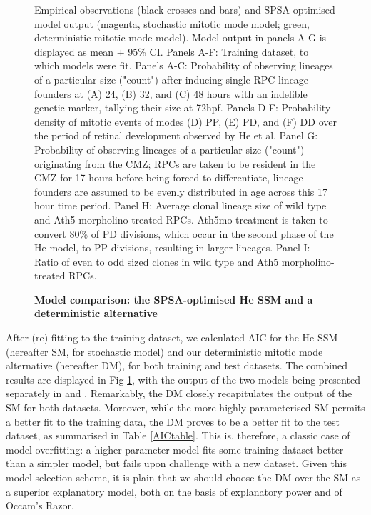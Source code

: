 \begin{figure}[p]
\caption{{\bf Model comparison: the SPSA-optimised He SSM and a deterministic alternative}}
Empirical observations (black crosses and bars) and SPSA-optimised model output (magenta, stochastic mitotic mode model; green, deterministic mitotic mode model). Model output in panels A-G is displayed as mean $\pm$ 95\% CI. Panels A-F: Training dataset, to which models were fit. Panels A-C: Probability of observing lineages of a particular size ("count") after inducing single RPC lineage founders at (A) 24, (B) 32, and (C) 48 hours with an indelible genetic marker, tallying their size at 72hpf. Panels D-F: Probability density of mitotic events of modes (D) PP, (E) PD, and (F) DD over the period of retinal development observed by He et al. Panel G: Probability of observing lineages of a particular size ("count") originating from the CMZ; RPCs are taken to be resident in the CMZ for 17 hours before being forced to differentiate, lineage founders are assumed to be evenly distributed in age across this 17 hour time period. Panel H: Average clonal lineage size of wild type and Ath5 morpholino-treated RPCs. Ath5mo treatment is taken to convert 80\% of PD divisions, which occur in the second phase of the He model, to PP divisions, resulting in larger lineages. Panel I: Ratio of even to odd sized clones in wild type and Ath5 morpholino-treated RPCs.
\label{SDFig}
\end{figure}
\FloatBarrier

After (re)-fitting to the training dataset, we calculated AIC for the He SSM (hereafter SM, for stochastic model) and our deterministic mitotic mode alternative (hereafter DM), for both training and test datasets. The combined results are displayed in Fig \ref{SDFig}, with the output of the two models being presented separately in  and . Remarkably, the DM closely recapitulates the output of the SM for both datasets. Moreover, while the more highly-parameterised SM permits a better fit to the training data, the DM proves to be a better fit to the test dataset, as summarised in Table \ref{AICtable}. This is, therefore, a classic case of model overfitting: a higher-parameter model fits some training dataset better than a simpler model, but fails upon challenge with a new dataset. Given this model selection scheme, it is plain that we should choose the DM over the SM as a superior explanatory model, both on the basis of explanatory power and of Occam's Razor.

